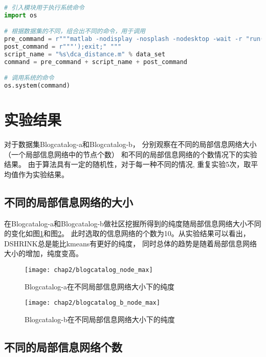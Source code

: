 \begin{lstlisting}[language={python}, caption={在Python中执行matlab的脚本}, label=code:call]

# 引入模块用于执行系统命令
import os

# 根据数据集的不同，组合出不同的命令，用于调用
pre_command = r"""matlab -nodisplay -nosplash -nodesktop -wait -r "run('"""
post_command = r"""');exit;" """
script_name = "%s\dca_distance.m" % data_set
command = pre_command + script_name + post_command

# 调用系统的命令
os.system(command)
\end{lstlisting}

\section{实验结果}
\label{sec:results}
对于数据集Blogcatalog-a和Blogcatalog-b，
分别观察在不同的局部信息网络大小（一个局部信息网络中的节点个数）
和不同的局部信息网络的个数情况下的实验结果。
由于算法具有一定的随机性，对于每一种不同的情况,
重复实验5次，取平均值作为实验结果。

\subsection{不同的局部信息网络的大小}
\label{sec:results_node_max}

在Blogcatalog-a和Blogcatalog-b做社区挖掘所得到的纯度随局部信息网络大小不同的变化如图\ref{fig:node_max:a}和图\ref{fig:node_max:b}。
此时选取的信息网络的个数为10。从实验结果可以看出，DSHRINK总是能比kmeans有更好的纯度，
同时总体的趋势是随着局部信息网络大小的增加，纯度变高。

\begin{figure}
    \texttt{[image: chap2/blogcatalog\_node\_max]}
    \caption{Blogcatalog-a在不同局部信息网络大小下的纯度}
    \label{fig:node_max:a}
\end{figure}

\begin{figure}
    \texttt{[image: chap2/blogcatalog\_b\_node\_max]}
    \caption{Blogcatalog-b在不同局部信息网络大小下的纯度}
    \label{fig:node_max:b}
\end{figure}

\subsection{不同的局部信息网络个数}
\label{sec:results_region_num}

